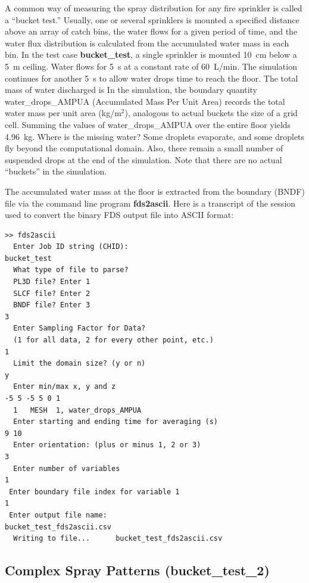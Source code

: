 \documentclass[11pt]{book}
\begin{document}
A common way of measuring the spray distribution for any fire sprinkler is called a ``bucket test.''  Usually, one or several sprinklers is
mounted a specified distance above an array of catch bins, the water flows for a given period of time, and the water flux distribution is calculated
from the accumulated water mass in each bin. In the test case {\bf bucket\_test}, a single sprinkler is mounted 10~cm below a 5~m ceiling. Water
flows for 5~s at a constant rate of 60~L/min.  The simulation continues for another 5~s to allow water drops time to reach the
floor. The total mass of water discharged is
\be
\ee
In the simulation, the boundary quantity {\ct water\_drops\_AMPUA} (Accumulated Mass Per Unit Area) records the total water mass per unit area (kg/m$^2$), analogous to
actual buckets the size of a grid cell.
Summing the values of {\ct water\_drops\_AMPUA} over the entire floor yields 4.96~kg. Where is the missing water? Some droplets evaporate, and some droplets
fly beyond the computational domain. Also, there remain a small number of suspended drops at the end of the simulation. Note that
there are no actual ``buckets'' in the simulation.

The accumulated water mass at the floor is extracted from the boundary ({\ct BNDF}) file via the command line program {\bf fds2ascii}. Here is a transcript of the session
used to convert the binary FDS output file into ASCII format:

\footnotesize
\begin{verbatim}
>> fds2ascii
  Enter Job ID string (CHID):
bucket_test
  What type of file to parse?
  PL3D file? Enter 1
  SLCF file? Enter 2
  BNDF file? Enter 3
3
  Enter Sampling Factor for Data?
  (1 for all data, 2 for every other point, etc.)
1
  Limit the domain size? (y or n)
y
  Enter min/max x, y and z
-5 5 -5 5 0 1
  1   MESH  1, water_drops_AMPUA
  Enter starting and ending time for averaging (s)
9 10
  Enter orientation: (plus or minus 1, 2 or 3)
3
  Enter number of variables
1
 Enter boundary file index for variable 1
1
 Enter output file name:
bucket_test_fds2ascii.csv
  Writing to file...      bucket_test_fds2ascii.csv
\end{verbatim}

\normalsize \noindent


\subsection{Complex Spray Patterns ({\bf bucket\_test\_2}) }
\end{document}
